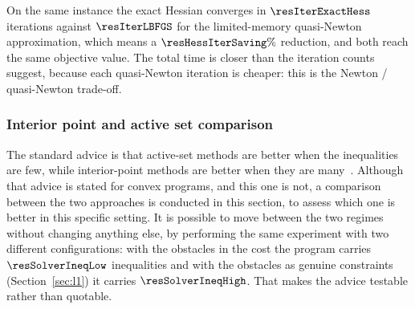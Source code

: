 \documentclass[11pt,a4paper]{article}
\begin{document}
\begin{table}[htbp]
  \centering
  \small
  \caption{%
  Interior-point iterations with the exact Hessian and with the limited-memory quasi-Newton approximation (L-BFGS),
  on the same instance. Bold: the lower iteration count.}
  \label{res:tab:hess}
\end{table}

On the same instance the exact Hessian converges in $\resIterExactHess$ iterations against $\resIterLBFGS$
for the limited-memory quasi-Newton approximation, which means a $\resHessIterSaving\%$ reduction, and both reach
the same objective value. The total time is closer than the iteration counts suggest, because each
quasi-Newton iteration is cheaper: this is the Newton / quasi-Newton trade-off.

\subsubsection{Interior point and active set comparison}
\label{sec:solvercmp}

The standard advice is that active-set methods are better when the inequalities are few, while interior-point
methods are better when they are many~\cite{fagiano2025noc}. Although that advice is stated for
convex programs, and this one is not, a comparison between the two approaches is conducted in this section,
to assess which one is better in this specific setting. It is possible to move between the two regimes
without changing anything else, by performing the same experiment with two different configurations: with
the obstacles in the cost the program carries
$\resSolverIneqLow$ inequalities and with the obstacles as genuine constraints (Section~\ref{sec:l1}) it
carries $\resSolverIneqHigh$. That makes the advice testable rather than quotable.

\begin{table}[htbp]
  \centering
  \small
  \caption{%
  The same three instances solved by a primal--dual interior-point method and by an SQP with an active-set
  QP solver, in both obstacle regimes: \emph{penalty} keeps the obstacles in the cost, $\ell^1$ carries them
  as constraints with slacks (Section~\ref{sec:l1}). Both solvers are started cold. Bold: the faster of the
  two. \emph{fail} marks a run in which the active-set QP subproblem could not be solved at all.
  $^\dagger$the only large-regime run that returns a solution ends at an objective $0.2\%$ away from
  IPOPT's, so that ratio is indicative rather than an exact like-for-like comparison.}
  \label{res:tab:solvercmp}
\end{table}
\end{document}
